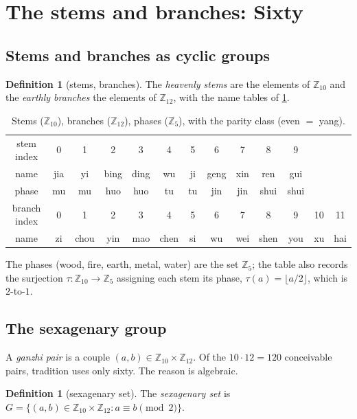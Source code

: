 \documentclass[11pt,a4paper]{article}
\theoremstyle{definition}
\newtheorem{definition}[theorem]{Definition}
\theoremstyle{remark}
\newcommand{\Z}{\mathbb{Z}}
\begin{document}
\section{The stems and branches: Sixty}\label{sec:ganzhi}

\subsection{Stems and branches as cyclic groups}

\begin{definition}[stems, branches]
The \emph{heavenly stems} are the elements of $\Z_{10}$ and the \emph{earthly branches} the elements of $\Z_{12}$, with the name tables of \cref{tab:names}.
\end{definition}

\begin{table}[h]\centering
\caption{Stems ($\Z_{10}$), branches ($\Z_{12}$), phases ($\Z_5$), with the parity class (even $=$ yang).\label{tab:names}}
\small
\begin{tabular}{c|cccccccccccc}
stem index & 0 & 1 & 2 & 3 & 4 & 5 & 6 & 7 & 8 & 9 & & \\
name & jia & yi & bing & ding & wu & ji & geng & xin & ren & gui & & \\
phase & mu & mu & huo & huo & tu & tu & jin & jin & shui & shui & & \\ \midrule
branch index & 0 & 1 & 2 & 3 & 4 & 5 & 6 & 7 & 8 & 9 & 10 & 11 \\
name & zi & chou & yin & mao & chen & si & wu & wei & shen & you & xu & hai
\end{tabular}
\end{table}

The phases (wood, fire, earth, metal, water) are the set $\Z_5$; the table also records the surjection $\tau:\Z_{10}\to\Z_5$ assigning each stem its phase, $\tau(a)=\lfloor a/2\rfloor$, which is $2$-to-$1$.

\subsection{The sexagenary group}

A \emph{ganzhi pair} is a couple $(a,b)\in\Z_{10}\times\Z_{12}$. Of the $10\cdot 12=120$ conceivable pairs, tradition uses only sixty. The reason is algebraic.

\begin{definition}[sexagenary set]
The \emph{sexagenary set} is $G=\{(a,b)\in\Z_{10}\times\Z_{12}:a\equiv b\pmod 2\}$.
\end{definition}
\end{document}
